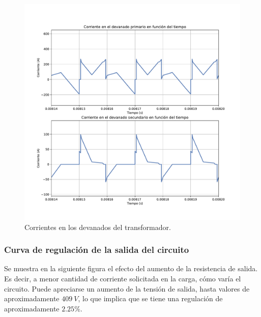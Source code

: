 \begin{figure}
	\centering
	\includegraphics[width=1\linewidth]{../../corrientes_transformador}
	\caption{Corrientes en los devanados del transformador.}
	\label{fig:corrientestransformador}
\end{figure}

\subsubsection{Curva de regulación de la salida del circuito}

Se muestra en la siguiente figura el efecto del aumento de la resistencia de salida. Es decir, a menor cantidad de corriente solicitada en la carga, cómo varía el circuito. Puede apreciarse un aumento de la tensión de salida, hasta valores de aproximadamente $409 \ V$, lo que implica que se tiene una regulación de aproximadamente $2.25\%$.

